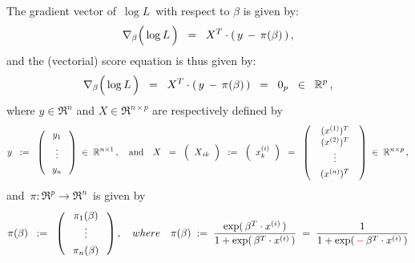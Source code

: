 \begin{proposition}
\begin{enumerate}
	The gradient vector of \,$\log L$\, with respect to $\beta$ is given by:
	\begin{equation*}
	\nabla_{\beta}\!\left(\,\overset{{\color{white}.}}{\log}\,L\,\right)
	\;\; = \;\;
		X^{T} \cdot \left(\, y \,-\, \pi(\beta) \,\right),
	\end{equation*}
	and the (vectorial) score equation is thus given by:
	\begin{equation*}
	\nabla_{\beta}\!\left(\,\overset{{\color{white}.}}{\log}\,L\,\right)
	\;\; = \;\;
		X^{T} \cdot \left(\, y \,-\, \pi(\beta) \,\right)
	\;\; = \;\;
		0_{p} \;\; \in \;\; \Re^{p}\,,
	\end{equation*}
	where $y \in \Re^{n}$ and $X \in \Re^{n \times p}$ are respectively defined by
	\begin{equation*}
	y
	\;\; := \;\;
		\left(\;\begin{array}{c}
		y_{1} \\
		\underset{{\color{white}.}}{\overset{{\color{white}.}}{\vdots}} \\
		y_{n}
		\end{array}\;\right)
	\;\in\;
		\Re^{n \times 1}\,, 
	\quad\textnormal{and}\quad
	X
	\;\;=\;\;
		\left(\;\;\overset{{\color{white}.}}{X}_{ik}\;\;\right)
	\;\;:=\;\;
		\left(\;\; x^{(i)}_{k} \;\;\right)
	\;\;=\;\;
		\left(\;\;
			\begin{array}{c} (x^{(1)})^{T} \\ (x^{(2)})^{T} \\ \underset{{\color{white}1}}{\vdots} \\ (x^{(n)})^{T} \end{array}
			\;\;\right)
	\; \in \; \Re^{n \times p}\,,
	\end{equation*}
	and \,$\pi : \Re^{p} \longrightarrow \Re^{n}$\, is given by
	\begin{equation*}
	\pi(\beta) \;\;:=\;\; \left(\;
		\begin{array}{c} \pi_{1}(\beta) \\ \underset{{\color{white}^{.}}}{\vdots} \\ \pi_{n}(\beta) \end{array}
		\;\right),
	\quad{where}\quad
	\pi(\beta)
	\; := \;
		\dfrac{\exp(\,\beta^{T} \cdot x^{(i)}\,)}{1 + \exp(\,\beta^{T} \cdot x^{(i)}\,)}
	\; = \;
		\dfrac{1}{1 + \exp(\,{\color{red}-}\,\beta^{T} \cdot x^{(i)}\,)}
	\end{equation*}

\end{enumerate}
\end{proposition}
